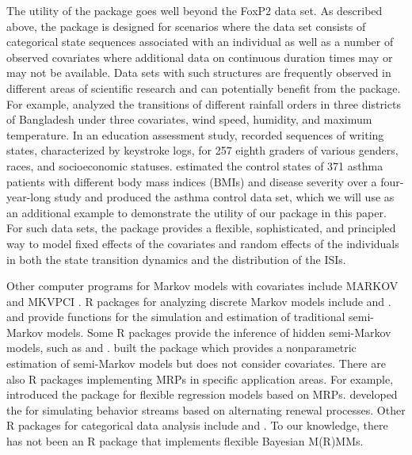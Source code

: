 {The utility of the  package goes well beyond the FoxP2 data set. %
As described above, the package is designed for scenarios where 
the data set consists of categorical state sequences associated with an individual as well as a number of observed covariates 
where additional data on continuous duration times may or may not be available.
Data sets with such structures are frequently observed in different areas of scientific research  and can potentially benefit from the    package. 
For example,  \citet{islam2006higher} analyzed the transitions of different rainfall  orders  in three districts of Bangladesh under three covariates, wind speed, humidity, and maximum temperature. 
In an education assessment study,  \citet{zhang2019scenario}  recorded sequences of writing states, characterized by keystroke logs, for  257 eighth graders of various genders, races, and socioeconomic statuses. 
\citet{combescure2003assessment} estimated the control states  of 371 asthma patients with different body mass indices (BMIs) and disease severity over a four-year-long study and produced the asthma control data set, which 
we will use as an additional example to demonstrate the utility of our package in this paper.  
For such data sets, the  package provides a flexible, sophisticated, and principled way to model fixed effects of the covariates and random effects of the individuals in both the state transition dynamics and the distribution of the ISIs. }






 
{Other computer programs for Markov models with covariates include MARKOV \citep{marshall1995markov} and MKVPCI  \citep{alioum2001mkvpci}.
R packages for analyzing discrete Markov models include   \citep{Spedicato2017Discrete} and  \citep{jackson2011multi}.}
 \citep{listwon2015semimarkov}  and  \citep{barbu2018smm} provide functions for the simulation and estimation of traditional semi-Markov models.   
Some R packages provide the inference of hidden semi-Markov models,   such as    \citep{o2011hidden}  and  \citep{amini2022hhsmm}. 
 {\citet{ferguson2012mssurv} built the  package  which  provides a nonparametric estimation of semi-Markov models but does not consider covariates.} 
 There are also R packages implementing MRPs in specific application areas.
 For example, \citet{kharrat2019flexible}  introduced the  package for flexible regression models based on MRPs. 
 \citet{pustejovsky2021} developed the  for simulating behavior streams based on alternating renewal processes.  
 Other R packages for categorical data analysis include  \citep{katsura1980catdap} and   \citep{meyer2022vcd}.
 {To our knowledge, there has not been an R package that implements flexible Bayesian M(R)MMs.}
 
